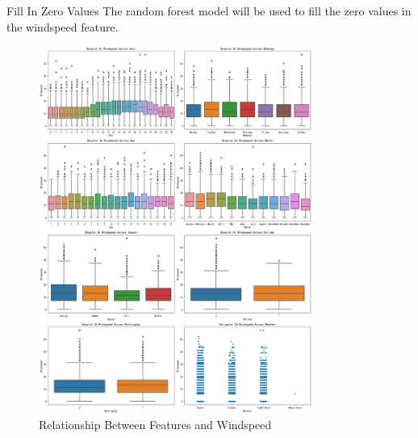\documentclass[
size=14pt,
paper=smartboard,  %
mode=present, 		%
display=slides, 	%
style=tuliplab,  	%
pauseslide,
fleqn,leqno]{powerdot}
\begin{document}
	\begin{slide}{Fill In Zero Values}
		The random forest model will be used to fill the zero values in the windspeed feature.
		\begin{figure}[htbp]
			\centering
			\includegraphics[width=0.8\textwidth,height=0.5\textwidth]{tree.eps}
			\caption{Relationship Between Features and Windspeed} \label{framework}
		\end{figure}
	\end{slide}
	
	
	
\end{document}

